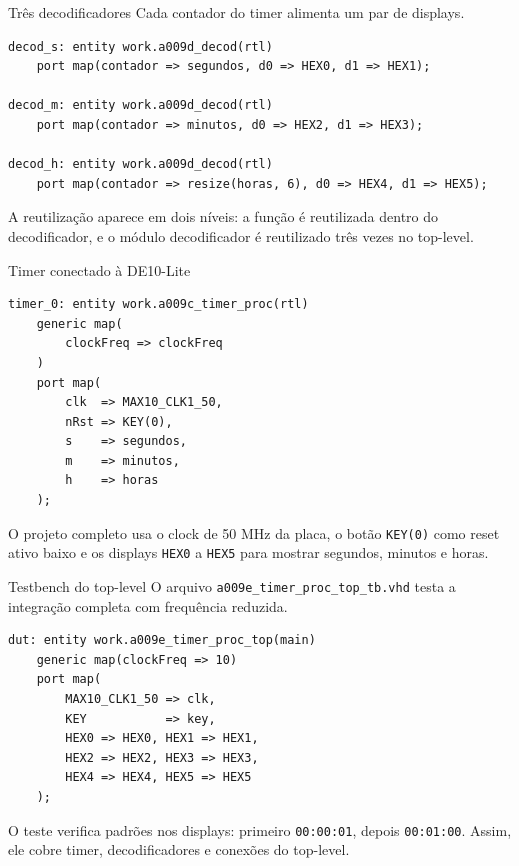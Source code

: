 \documentclass[aspectratio=169,11pt]{beamer}
\begin{document}
\begin{frame}[fragile]{Três decodificadores}
    Cada contador do timer alimenta um par de displays.

\begin{lstlisting}
decod_s: entity work.a009d_decod(rtl)
    port map(contador => segundos, d0 => HEX0, d1 => HEX1);

decod_m: entity work.a009d_decod(rtl)
    port map(contador => minutos, d0 => HEX2, d1 => HEX3);

decod_h: entity work.a009d_decod(rtl)
    port map(contador => resize(horas, 6), d0 => HEX4, d1 => HEX5);
\end{lstlisting}

    \vspace{0.4em}
    A reutilização aparece em dois níveis: a função é reutilizada dentro do decodificador, e o módulo decodificador é reutilizado três vezes no top-level.
\end{frame}

\begin{frame}[fragile]{Timer conectado à DE10-Lite}
\begin{lstlisting}
timer_0: entity work.a009c_timer_proc(rtl)
    generic map(
        clockFreq => clockFreq
    )
    port map(
        clk  => MAX10_CLK1_50,
        nRst => KEY(0),
        s    => segundos,
        m    => minutos,
        h    => horas
    );
\end{lstlisting}

    \vspace{0.4em}
    O projeto completo usa o clock de 50 MHz da placa, o botão \texttt{KEY(0)} como reset ativo baixo e os displays \texttt{HEX0} a \texttt{HEX5} para mostrar segundos, minutos e horas.
\end{frame}

\begin{frame}[fragile]{Testbench do top-level}
    O arquivo \texttt{a009e\_timer\_proc\_top\_tb.vhd} testa a integração completa com frequência reduzida.

\begin{lstlisting}
dut: entity work.a009e_timer_proc_top(main)
    generic map(clockFreq => 10)
    port map(
        MAX10_CLK1_50 => clk,
        KEY           => key,
        HEX0 => HEX0, HEX1 => HEX1,
        HEX2 => HEX2, HEX3 => HEX3,
        HEX4 => HEX4, HEX5 => HEX5
    );
\end{lstlisting}

    \vspace{0.3em}
    O teste verifica padrões nos displays: primeiro \texttt{00:00:01}, depois \texttt{00:01:00}. Assim, ele cobre timer, decodificadores e conexões do top-level.
\end{frame}
\end{document}

